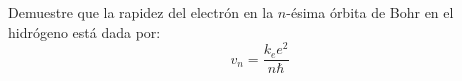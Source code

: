 \item Demuestre que la rapidez del electrón en la $n$-ésima órbita de Bohr en el hidrógeno está dada por:
$$ v_n = \frac{k_e e^2}{n\hbar} $$
